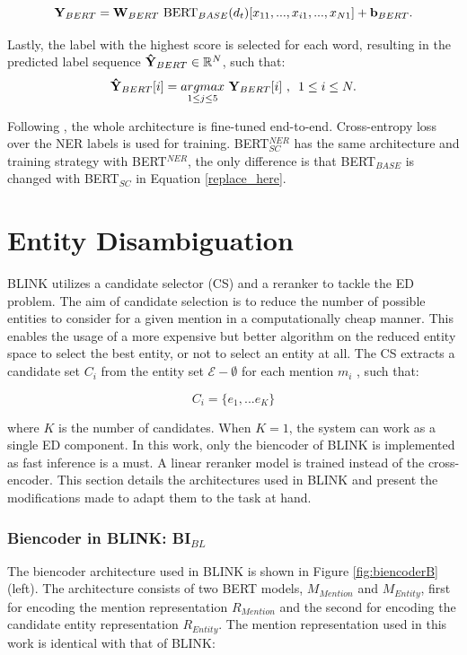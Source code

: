 \documentclass{report}
\theoremstyle{definition}
\theoremstyle{remark}
\begin{document}
\begin{equation}
\label{replace_here}
   \bold{Y}_{BERT} = \bold{W}_{BERT} \ \text{BERT}_{BASE}(d_t)[x_{11},...,x_{i1},...,x_{N1}] + \bold{b}_{BERT}.
\end{equation}

Lastly, the label with the highest score is selected for each word, resulting in the predicted label sequence $\bold{\Hat{Y}}_{BERT} \in \mathbb{R}^N$, such that:
\begin{equation}
    \bold{\Hat{Y}}_{BERT}[i] = \underset{1\leq j\leq5}{argmax} \ \bold{Y}_{BERT} [i] \ \text{, } \ 1\leq i \leq N. 
\end{equation}

Following \cite{BERT}, the whole architecture is fine-tuned end-to-end. Cross-entropy loss over the NER labels is used for training. BERT$^{NER}_{SC}$ has the same architecture and training strategy with BERT$^{NER}$, the only difference is that BERT$_{BASE}$ is changed with BERT$_{SC}$ in Equation \ref{replace_here}.

\section{Entity Disambiguation}
\label{sec:entdismethod}
BLINK utilizes a candidate selector (CS) and a reranker to tackle the ED problem. The aim of candidate selection is to reduce the number of possible entities to consider for a given mention in a computationally cheap manner. This enables the usage of a more expensive but better algorithm on the reduced entity space to select the best entity, or not to select an entity at all. The CS extracts a candidate set $C_i$ from the entity set $\mathcal{E} - \emptyset$ for each mention $m_i$ , such that:

\begin{equation}
    C_i = \{e_1,...e_K\} 
\end{equation}

\noindent where $K$ is the number of candidates. When $K=1$, the system can work as a single ED component. In this work, only the biencoder of BLINK is implemented as fast inference is a must. A linear reranker model is trained instead of the cross-encoder. This section details the architectures used in BLINK and present the modifications made to adapt them to the task at hand.

\subsubsection{Biencoder in BLINK: BI$_{BL}$}
\label{sec:biencoderbexplanation}
The biencoder architecture used in BLINK is shown in Figure \ref{fig:biencoderB} (left). The architecture consists of two BERT models, $M_{Mention}$ and $M_{Entity}$, first for encoding the mention representation $R_{Mention}$ and the second for encoding the candidate entity representation $R_{Entity}$. The mention representation used in this work is identical with that of BLINK:
\end{document}
